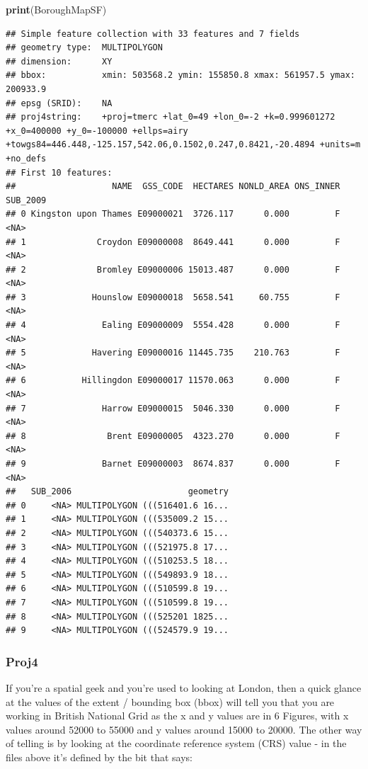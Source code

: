 \documentclass[]{book}
\newenvironment{Shaded}{\begin{snugshade}}{\end{snugshade}}
\newcommand{\KeywordTok}[1]{\textcolor[rgb]{0.13,0.29,0.53}{\textbf{#1}}}
\newcommand{\NormalTok}[1]{#1}
\begin{document}
\begin{Shaded}
\begin{Highlighting}[]
\KeywordTok{print}\NormalTok{(BoroughMapSF)}
\end{Highlighting}
\end{Shaded}

\begin{verbatim}
## Simple feature collection with 33 features and 7 fields
## geometry type:  MULTIPOLYGON
## dimension:      XY
## bbox:           xmin: 503568.2 ymin: 155850.8 xmax: 561957.5 ymax: 200933.9
## epsg (SRID):    NA
## proj4string:    +proj=tmerc +lat_0=49 +lon_0=-2 +k=0.999601272 +x_0=400000 +y_0=-100000 +ellps=airy +towgs84=446.448,-125.157,542.06,0.1502,0.247,0.8421,-20.4894 +units=m +no_defs
## First 10 features:
##                   NAME  GSS_CODE  HECTARES NONLD_AREA ONS_INNER SUB_2009
## 0 Kingston upon Thames E09000021  3726.117      0.000         F     <NA>
## 1              Croydon E09000008  8649.441      0.000         F     <NA>
## 2              Bromley E09000006 15013.487      0.000         F     <NA>
## 3             Hounslow E09000018  5658.541     60.755         F     <NA>
## 4               Ealing E09000009  5554.428      0.000         F     <NA>
## 5             Havering E09000016 11445.735    210.763         F     <NA>
## 6           Hillingdon E09000017 11570.063      0.000         F     <NA>
## 7               Harrow E09000015  5046.330      0.000         F     <NA>
## 8                Brent E09000005  4323.270      0.000         F     <NA>
## 9               Barnet E09000003  8674.837      0.000         F     <NA>
##   SUB_2006                       geometry
## 0     <NA> MULTIPOLYGON (((516401.6 16...
## 1     <NA> MULTIPOLYGON (((535009.2 15...
## 2     <NA> MULTIPOLYGON (((540373.6 15...
## 3     <NA> MULTIPOLYGON (((521975.8 17...
## 4     <NA> MULTIPOLYGON (((510253.5 18...
## 5     <NA> MULTIPOLYGON (((549893.9 18...
## 6     <NA> MULTIPOLYGON (((510599.8 19...
## 7     <NA> MULTIPOLYGON (((510599.8 19...
## 8     <NA> MULTIPOLYGON (((525201 1825...
## 9     <NA> MULTIPOLYGON (((524579.9 19...
\end{verbatim}

\hypertarget{proj4}{%
\subsubsection{Proj4}\label{proj4}}

If you're a spatial geek and you're used to looking at London, then a quick glance at the values of the extent / bounding box (bbox) will tell you that you are working in British National Grid as the x and y values are in 6 Figures, with x values around 52000 to 55000 and y values around 15000 to 20000. The other way of telling is by looking at the coordinate reference system (CRS) value - in the files above it's defined by the bit that says:
\end{document}
